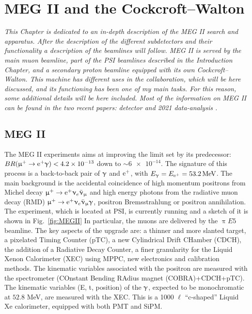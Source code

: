 \chapter{MEG II and the Cockcroft–Walton}
\label{ch:MEG}
\begin{refsection}
{\itshape This Chapter is dedicated to an in-depth description of the MEG II search and apparatus. After the description of the different subdetectors and their functionality a description of the beamlines will follow. MEG II is served by the main muon beamline, part of the PSI beamlines described in the Introduction Chapter, and a secondary proton beamline equipped with its own Cockcroft–Walton. This machine has different uses in the collaboration, which will be here discussed, and its functioning has been one of my main tasks. For this reason, some additional details will be here included. Most of the information on MEG II can be found in the two recent papers: detector \cite{MEG_II:detector} and 2021 data-analysis \cite{MEG_II:2021}.}

\section{MEG II}
    The MEG II experiments aims at improving the limit set by its predecessor: $BR(\upmu^+\rightarrow\text{e}^+\upgamma)<\num{4.2e-13}$ \cite{MEG} down to $\sim\num{6e-14}$.
    The signature of this process is a back-to-back pair of $\upgamma$ and $\text{e}^+$, with $E_\upgamma = E_{\text{e}^+} = \SI{53.2}{MeV}$.
    The main background is the accidental coincidence of high momentum positrons from Michel decay $\upmu^+ \rightarrow \text{e}^+ \upnu_e \bar{\upnu}_\upmu$ and high energy photons from the radiative muon decay (RMD) $\upmu^+\rightarrow\text{e}^+\upnu_e \bar{\upnu}_\upmu\upgamma$, positron Bremsstrahlung or positron annihilation.\\
    The experiment, which is located at PSI, is currently running and a sketch of it is shown in Fig.~\ref{fig:MEGII}
    In particular, the muons are delivered by the $\uppi E5$ beamline.
    The key aspects of the upgrade are: a thinner and more slanted target, a pixelated Timing Counter (pTC), a new Cylindrical Drift CHamber (CDCH), the addition of a Radiative Decay Counter, a finer granularity for the Liquid Xenon Calorimeter (XEC) using MPPC, new electronics and calibration methods.
    The kinematic variables associated with the positron are measured with the spectrometer (COnstant Bending RAdius magnet (COBRA)+CDCH+pTC). 
    The kinematic variables (E, t, position) of the $\upgamma$, expected to be monochromatic at $52.8$ MeV, are measured with the XEC.
    This is a 1000 $\ell$ ``c-shaped'' Liquid Xe calorimeter, equipped with both PMT and SiPM.\\

\end{refsection}

